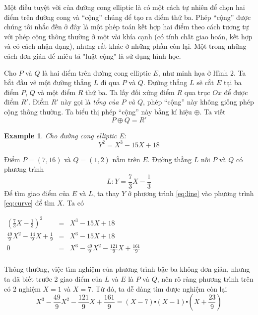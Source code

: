 \documentclass[12pt]{article}
\newtheorem{example}{Example}
\begin{document}
Một điều tuyệt vời của đường cong elliptic là có một cách tự nhiên để chọn hai điểm trên đường cong và
``cộng'' chúng để tạo ra điểm thứ ba. Phép ``cộng'' được chúng tôi nhắc đến ở đây là một phép toán kết hợp hai điểm theo cách tương tự với phép cộng thông thường
ở một vài khía cạnh (có tính chất giao hoán, kết hợp và có cách nhận dạng), nhưng rất khác ở những phần còn lại. Một trong những cách đơn giản để miêu tả "luật cộng" là sử dụng hình học.

Cho $P$ và $Q$ là hai điểm trên đường cong elliptic $E$, như minh họa ở Hình 2. Ta bắt đầu vẽ một đường thẳng $L$ đi qua $P$ và $Q$. Đường thẳng
$L$ sẽ cắt $E$ tại ba điểm $P$, $Q$ và một điểm $R$ thứ ba. Ta lấy đối xứng điểm $R$ qua trục $Ox$ để được điểm $R'$. Điểm $R'$ này gọi là \textit{tổng của $P$ và $Q$},
phép ``cộng'' này không giống phép cộng thông thường. Ta biểu thị phép ``cộng'' này bằng kí hiệu $\oplus$. Ta viết
\begin{equation}
    P \oplus Q = R'
\end{equation}

\begin{example}
    \label{ex:ex1}
    Cho đường cong elliptic E:
    \begin{equation}
        \label{eq:curve}
        Y^2 = X^3 -15X + 18
    \end{equation}
\end{example}
Điểm $P = (7,16)$ và $Q = (1,2)$ nằm trên $E$. Đường thẳng $L$ nối $P$ và $Q$ có phương trình
\begin{equation}
    \label{eq:line}
    L: Y = \frac{7}{3}X - \frac{1}{3}
\end{equation}
Để tìm giao điểm của $E$ và $L$, ta thay $Y$ ở phương trình \eqref{eq:line} vào phương trình \eqref{eq:curve} để tìm $X$. Ta có
\begin{center}

    $
        \begin{array}{rcl}
            (\frac{7}{3}X - \frac{1}{3})^2                & = & X^3 -15X+18                                        \\
            \frac{49}{9}X^2 - \frac{14}{9}X + \frac{1}{9} & = & X^3 -15X+18                                        \\
            0                                             & = & X^3 -\frac{49}{9}X^2 -\frac{121}{9}X+\frac{161}{9} \\
        \end{array}
    $
\end{center}
Thông thường, việc tìm nghiệm của phương trình bậc ba không đơn giản, nhưng ta đã biết trước 2 giao điểm của $L$ và $E$ là $P$ và $Q$, nên rõ ràng phương trình trên
có 2 nghiệm $X=1$ và $X=7$. Từ đó, ta dễ dàng tìm được nghiệm còn lại
$$X^3 -\frac{49}{9}X^2 -\frac{121}{9}X+\frac{161}{9} = (X-7) \centerdot  (X-1) \centerdot (X+\frac{23}{9})$$
\end{document}

